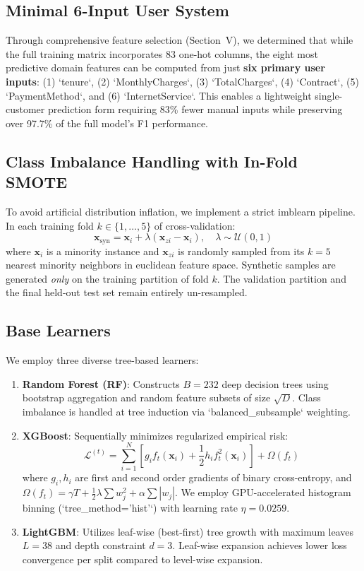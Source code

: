 \documentclass[conference]{IEEEtran}
\begin{document}
\subsection{Minimal 6-Input User System}
Through comprehensive feature selection (Section~V), we determined that while the full training matrix incorporates 83 one-hot columns, the eight most predictive domain features can be computed from just \textbf{six primary user inputs}: (1) `tenure`, (2) `MonthlyCharges`, (3) `TotalCharges`, (4) `Contract`, (5) `PaymentMethod`, and (6) `InternetService`. This enables a lightweight single-customer prediction form requiring 83\% fewer manual inputs while preserving over 97.7\% of the full model's F1 performance.

\subsection{Class Imbalance Handling with In-Fold SMOTE}
To avoid artificial distribution inflation, we implement a strict imblearn pipeline. In each training fold $k \in \{1, \dots, 5\}$ of cross-validation:
\begin{equation}
    \mathbf{x}_{\text{syn}} = \mathbf{x}_i + \lambda (\mathbf{x}_{zi} - \mathbf{x}_i), \quad \lambda \sim \mathcal{U}(0, 1)
\end{equation}
where $\mathbf{x}_i$ is a minority instance and $\mathbf{x}_{zi}$ is randomly sampled from its $k=5$ nearest minority neighbors in euclidean feature space. Synthetic samples are generated \textit{only} on the training partition of fold $k$. The validation partition and the final held-out test set remain entirely un-resampled.

\subsection{Base Learners}
We employ three diverse tree-based learners:
\begin{enumerate}
    \item \textbf{Random Forest (RF)}: Constructs $B=232$ deep decision trees using bootstrap aggregation and random feature subsets of size $\sqrt{D}$. Class imbalance is handled at tree induction via `balanced\_subsample` weighting.
    \item \textbf{XGBoost}: Sequentially minimizes regularized empirical risk:
    \begin{equation}
        \mathcal{L}^{(t)} = \sum_{i=1}^N \left[ g_i f_t(\mathbf{x}_i) + \frac{1}{2} h_i f_t^2(\mathbf{x}_i) \right] + \Omega(f_t)
    \end{equation}
    where $g_i, h_i$ are first and second order gradients of binary cross-entropy, and $\Omega(f_t) = \gamma T + \frac{1}{2}\lambda \sum w_j^2 + \alpha \sum |w_j|$. We employ GPU-accelerated histogram binning (`tree\_method='hist'`) with learning rate $\eta=0.0259$.
    \item \textbf{LightGBM}: Utilizes leaf-wise (best-first) tree growth with maximum leaves $L=38$ and depth constraint $d=3$. Leaf-wise expansion achieves lower loss convergence per split compared to level-wise expansion.
\end{enumerate}
\end{document}
